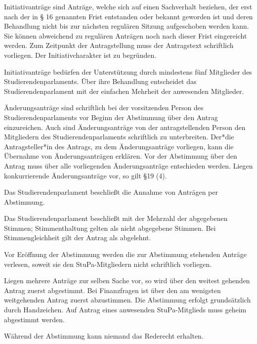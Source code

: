 \documentclass[10pt,a4paper]{scrartcl}
\begin{document}
\begin{contract}
\label{initiativantruxe4ge}

Initiativanträge sind Anträge, welche sich auf einen Sachverhalt beziehen, der
erst nach der in § 16 genannten Frist entstanden oder bekannt geworden ist und
deren Behandlung nicht bis zur nächsten regulären Sitzung aufgeschoben werden
kann. Sie können abweichend zu regulären Anträgen noch nach dieser Frist
eingereicht werden. Zum Zeitpunkt der Antragstellung muss der Antragstext
schriftlich vorliegen. Der Initiativcharakter ist zu begründen.

Initiativanträge bedürfen der Unterstützung durch mindestens fünf Mitglieder des
Studierendenparlaments. Über ihre Behandlung entscheidet das
Studierendenparlament mit der einfachen Mehrheit der anwesenden Mitglieder.

\label{uxe4nderungsantruxe4ge}

Änderungsanträge sind schriftlich bei der vorsitzenden Person des
Studierendenparlaments vor Beginn der Abstimmung über den Antrag
einzureichen. Auch sind Änderungsanträge von der antragstellenden Person
den Mitgliedern des Studierendenparlaments schriftlich zu unterbreiten.
Der*die Antragsteller*in des Antrags, zu dem Änderungsanträge vorliegen,
kann die Übernahme von Änderungsanträgen erklären. Vor der Abstimmung
über den Antrag muss über alle vorliegenden Änderungsanträge entschieden
werden. Liegen konkurrierende Änderungsanträge vor, so gilt §19 (4).


\label{abstimmungen}

Das Studierendenparlament beschließt die Annahme von Anträgen per
Abstimmung.

Das Studierendenparlament beschließt mit der Mehrzahl der abgegebenen
Stimmen; Stimmenthaltung gelten als nicht abgegebene Stimmen. Bei
Stimmengleichheit gilt der Antrag als abgelehnt.

Vor Eröffnung der Abstimmung werden die zur Abstimmung stehenden
Anträge verlesen, soweit sie den StuPa-Mitgliedern nicht schriftlich
vorliegen.

Liegen mehrere Anträge zur selben Sache vor, so wird über den weitest
gehenden Antrag zuerst abgestimmt. Bei Finanzfragen ist über den am
wenigsten weitgehenden Antrag zuerst abzustimmen. Die Abstimmung
erfolgt grundsätzlich durch Handzeichen. Auf Antrag eines anwesenden
StuPa-Mitglieds muss geheim abgestimmt werden.

Während der Abstimmung kann niemand das Rederecht erhalten.


\end{contract}
\end{document}
